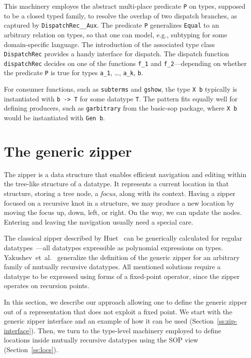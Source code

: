 \documentclass[runningheads]{llncs}
\newcommand{\K}[1]{\lstinline{#1}}
\begin{document}
This machinery employes the abstract multi-place predicate \K{P} on types, supposed to be a closed typed family, to resolve the overlap of two dispatch branches, as captured by \K{DispatchRec__Aux}. The predicate \K{P} generalizes \K{Equal} to an arbitrary relation on types, so that one can model, e.g., subtyping for some domain-specific language. The introduction of the associated type class \K{DispatchRec} provides a handy interface for dispatch. The dispatch function \K{dispatchRec} decides on one of the functions \K{f_1} and \K{f_2}---depending on whether the predicate \K{P} is true for types \K{a_1}, \dots, \K{a_k}, \K{b}.

For consumer functions, such as \K{subterms} and \K{gshow}, the type \K{X b} typically is instantiated with \K{b -> T} for some datatype \K{T}. The pattern fits equally well for defining producers, such as \K{garbitrary} from the \textsf{basic-sop} package, where \K{X b} would be instantiated with \K{Gen b}.


\section{The generic zipper}
\label{sec:generic-zipper}


The zipper is a data structure that enables efficient navigation and editing within the tree-like structure of a datatype. It represents a current location in that structure, storing a tree node, a \emph{focus}, along with its context. Having a zipper focused on a recursive knot in a structure, we may produce a new location by moving the focus up, down, left, or right. On the way, we can update the nodes. Entering and leaving the navigation usually need a special care.

The classical zipper described by Huet~\cite{Huet1997} can be generically calculated for regular datatypes~\cite{HiJeLo2004}---all datatypes expressible as polynomial expressions on types. Yakushev~et~al.~\cite{MuRec2009} generalize the definition of the generic zipper for an arbitrary family of mutually recursive datatypes. All mentioned solutions require a datatype to be expressed using forms of a fixed-point operator, since the zipper operates on recursion points. 

In this section, we describe our approach allowing one to define the generic zipper out of a representation that does not exploit a fixed point. We start with the generic zipper interface and an example of how it can be used (Section~\ref{ss:zip-interface}). Then, we turn to the type-level machinery employed to define locations inside mutually recursive datatypes using the SOP view  (Section~\ref{ss:locs}).
\end{document}
